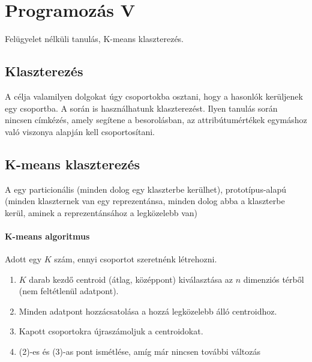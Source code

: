\documentclass[../../main.tex]{subfiles}
\begin{document}
\section{Programozás V}

\begin{fulltheorem}
  Felügyelet nélküli tanulás, K-means klaszterezés.
\end{fulltheorem}

\subsection{Klaszterezés}

A  célja valamilyen dolgokat úgy csoportokba osztani, hogy a
hasonlók kerüljenek egy csoportba. A  során
is használhatunk klaszterezést. Ilyen tanulás során nincsen címkézés, amely
segítene a besorolásban, az attribútumértékek egymáshoz való viszonya alapján
kell csoportosítani.

\subsection{K-means klaszterezés}

A  egy particionális (minden dolog egy klaszterbe
kerülhet), prototípus-alapú (minden klaszternek van egy reprezentánsa, minden
dolog abba a klaszterbe kerül, aminek a reprezentánsához a legközelebb van)

\paragraph{K-means algoritmus}

Adott egy $K$ szám, ennyi csoportot szeretnénk létrehozni.
\begin{enumerate}
  \item $K$ darab kezdő centroid (átlag, középpont) kiválasztása az $n$
        dimenziós térből (nem feltétlenül adatpont).
  \item Minden adatpont hozzácsatolása a hozzá legközelebb álló centroidhoz.
  \item Kapott csoportokra újraszámoljuk a centroidokat.
  \item (2)-es és (3)-as pont ismétlése, amíg már nincsen további változás
\end{enumerate}
\end{document}
